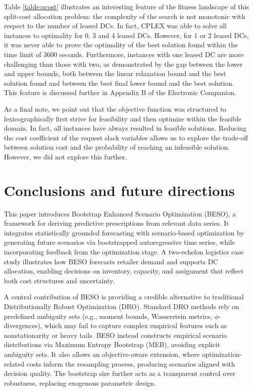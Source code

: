 \documentclass[mnsc,sglanonrev]{informs4}  %
\theoremstyle{remark}\newtheorem{remark}{Remark}
\begin{document}
Table \ref{table:qcost} illustrates an interesting feature of the fitness landscape of this split-cost allocation problem: the complexity of the search is not monotonic with respect to the number of leased DCs. In fact, CPLEX was able to solve all instances to optimality for 0, 3 and 4 leased DCs. However, for 1 or 2 leased DCs, it was never able to prove the optimality of the best solution found within the time limit of 3600 seconds. Furthermore, instances with one leased DC are more challenging than those with two, as demonstrated by the gap between the lower and upper bounds, both between the linear relaxation bound and the best solution found and between the best final lower bound and the best solution. This feature is discussed further in Appendix B of the Electronic Companion.

As a final note, we point out that the objective function was structured to lexicographically first strive for feasibility and then optimize within the feasible domain. In fact, all instances have always resulted in feasible solutions. Reducing the cost coefficient of the request slack variables allows us to explore the trade-off between solution cost and the probability of reaching an infeasible solution. However, we did not explore this further.

\section{Conclusions and future directions} \label{Sec:conclusions}

This paper introduces Bootstrap Enhanced Scenario Optimization (BESO), a framework for deriving predictive prescriptions from  relevant data series. It integrates statistically grounded forecasting with scenario-based optimization by generating future scenarios via bootstrapped autoregressive time series, while incorporating feedback from the optimization stage. A two-echelon logistics case study illustrates how BESO forecasts retailer demand and supports DC allocation, enabling decisions on inventory, capacity, and assignment that reflect both cost structures and uncertainty.

A central contribution of BESO is providing a credible alternative to traditional Distributionally Robust Optimization (DRO). Standard DRO methods rely on predefined ambiguity sets (e.g., moment bounds, Wasserstein metrics, $\phi$-divergences), which may fail to capture complex empirical features such as nonstationarity or heavy tails. BESO instead constructs empirical scenario distributions via Maximum Entropy Bootstrap (MEB), avoiding explicit ambiguity sets. It also allows an objective-aware extension, where optimization-related costs inform the resampling process, producing scenarios aligned with decision quality. The bootstrap size further acts as a transparent control over robustness, replacing exogenous parametric design.
\end{document}
